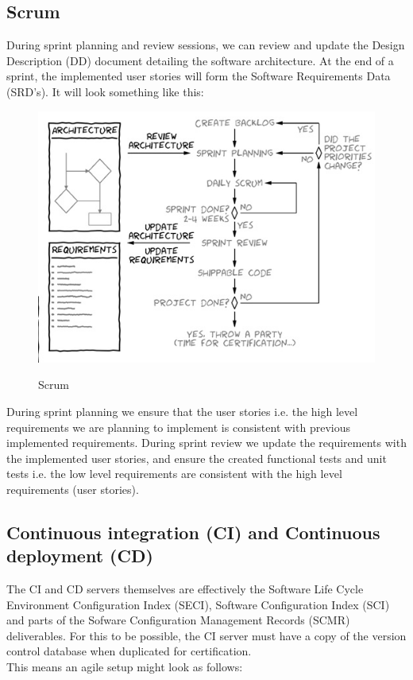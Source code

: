 \documentclass[a4paper]{article}
\begin{document}

\subsection{Scrum}
During sprint planning and review sessions, we can review and update the Design Description (DD) document detailing the software architecture. At the end of a sprint, the implemented user stories will form the Software Requirements Data (SRD's). It will look something like this:

\begin{center}
\begin{figure}[H]
\includegraphics[width=0.7\linewidth]{./pictures/scrum.jpg}\\
\caption{\label{fig:Scrum}Scrum}
\end{figure}
\end{center}

During sprint planning we ensure that the user stories i.e. the high level requirements we are planning to implement is consistent with previous implemented requirements. During sprint review we update the requirements with the implemented user stories, and ensure the created functional tests and unit tests i.e. the low level requirements are consistent with the high level requirements (user stories).


\subsection{Continuous integration (CI) and Continuous deployment (CD)}

The CI and CD servers themselves are effectively the Software Life Cycle Environment Configuration Index (SECI), Software Configuration Index (SCI) and parts of the Sofware Configuration Management Records (SCMR) deliverables. For this to be possible, the CI server must have a copy of the version control database when duplicated for certification. \\
This means an agile setup might look as follows:
\end{document}

